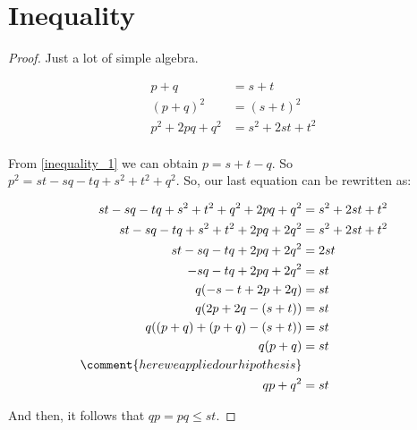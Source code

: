 ﻿\chapter{Inequality}

    
    \begin{proof}
        Just a lot of simple algebra.
        
        \begin{align}
            p + q               &=      s + t                   \\
            (p + q)^2           &=      (s + t)^2               \\
            p^2 + 2pq + q^2     &=      s^2 + 2st + t^2         \\
        \end{align}
        
        From \eqref{inequality_1} we can obtain $p = s + t - q$. So
        $p^2 = st - sq - tq + s^2 + t^2 + q^2$. So, our last equation can
        be rewritten as:
        
        \begin{align}
            st - sq - tq + s^2 + t^2 + q^2 + 2pq + q^2      &=      s^2 + 2st + t^2         \\         
            st - sq - tq + s^2 + t^2 + 2pq + 2q^2           &=      s^2 + 2st + t^2         \\         
            st - sq - tq + 2pq + 2q^2                       &=      2st                     \\         
            - sq - tq + 2pq + 2q^2                          &=      st                      \\         
            q (- s - t + 2p + 2q)                           &=      st                      \\         
            q (2p + 2q - (s + t))                           &=      st                      \\         
            q ((p + q) + (p + q) - (s + t))                 &=      st                      \\         
            q (p + q)                                       &=      st                      \\
            \comment{here we applied our hipothesis}        &                               \\                    
            qp + q^2                                        &=      st                      \\
        \end{align}
        
        And then, it follows that $qp = pq \leq st$.
    \end{proof}
    
